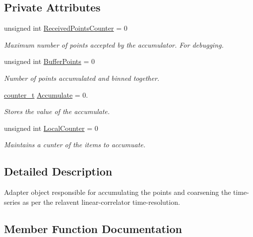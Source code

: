 \subsection*{Private Attributes}
\begin{DoxyCompactItemize}
\item 
unsigned int \hyperlink{classAccumulator_a9cc7c392e99778c99593f7798cb2ab3b}{Received\+Points\+Counter} = 0
\begin{DoxyCompactList}\small\item\em Maximum number of points accepted by the accumulator. For debugging. \end{DoxyCompactList}\item 
unsigned int \hyperlink{classAccumulator_a559e4fac031df015e47248599740b33c}{Buffer\+Points} = 0
\begin{DoxyCompactList}\small\item\em Number of points accumulated and binned together. \end{DoxyCompactList}\item 
\hyperlink{types_8hpp_a22f279793847eba127de149437848c48}{counter\+\_\+t} \hyperlink{classAccumulator_a8e615af8b85dd2c8500d1f8c473879ab}{Accumulate} = 0.
\begin{DoxyCompactList}\small\item\em Stores the value of the accumulate. \end{DoxyCompactList}\item 
unsigned int \hyperlink{classAccumulator_a753e3878c3078a11ee9bc13b6185ec60}{Local\+Counter} = 0
\begin{DoxyCompactList}\small\item\em Maintains a cunter of the items to accumuate. \end{DoxyCompactList}\end{DoxyCompactItemize}


\subsection{Detailed Description}
Adapter object responsible for accumulating the points and coarsening the time-\/series as per the relavent linear-\/correlator time-\/resolution. 

\subsection{Member Function Documentation}
\mbox{\label{classAccumulator_aa1793bc1599bc2451fabc44954673164}} 
